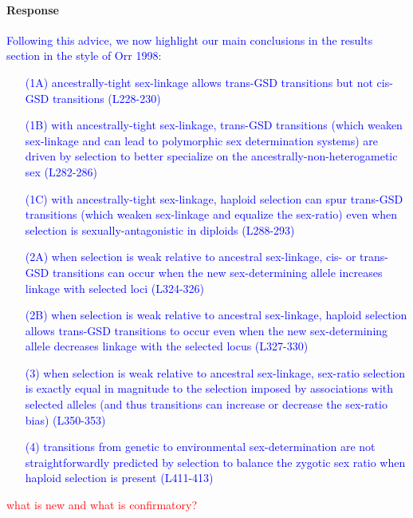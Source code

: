 \documentclass[10pt,letterpaper]{article}
\begin{document}
\noindent\paragraph{Response}
\textcolor{blue}{
Following this advice, we now highlight our main conclusions in the results section in the style of Orr 1998:
\begin{enumerate}
\item[(1A)] ancestrally-tight sex-linkage allows trans-GSD transitions but not cis-GSD transitions (L228-230)
\item[(1B)] with ancestrally-tight sex-linkage, trans-GSD transitions (which weaken sex-linkage and can lead to polymorphic sex determination systems) are driven by selection to better specialize on the ancestrally-non-heterogametic sex (L282-286)
\item[(1C)] with ancestrally-tight sex-linkage, haploid selection can spur trans-GSD transitions (which weaken sex-linkage and equalize the sex-ratio) even when selection is sexually-antagonistic in diploids  (L288-293)
\item[(2A)] when selection is weak relative to ancestral sex-linkage, cis- or trans-GSD transitions can occur when the new sex-determining allele increases linkage with selected loci (L324-326)
\item[(2B)] when selection is weak relative to ancestral sex-linkage, haploid selection allows trans-GSD transitions to occur even when the new sex-determining allele decreases linkage with the selected locus (L327-330)
\item[(3)] when selection is weak relative to ancestral sex-linkage, sex-ratio selection is exactly equal in magnitude to the selection imposed by associations with selected alleles (and thus transitions can increase or decrease the sex-ratio bias) (L350-353)
\item[(4)] transitions from genetic to environmental sex-determination are not straightforwardly predicted by selection to balance the zygotic sex ratio when haploid selection is present (L411-413)
\end{enumerate}
\textcolor{red}{what is new and what is confirmatory?} 
}
\end{document}
